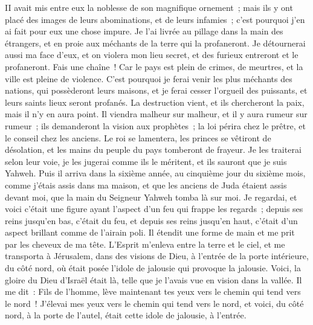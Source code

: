 \begin{multicols}{2}
II avait mis entre eux la noblesse de son magnifique ornement~; mais ils y ont placé des images de leurs abominations, et de leurs infamies~; c'est pourquoi j'en ai fait pour eux une chose impure.
Je l'ai livrée au pillage dans la main des étrangers, et en proie aux méchants de la terre qui la profaneront.
Je détournerai aussi ma face d'eux, et on violera mon lieu secret, et des furieux entreront et le profaneront.
Fais une chaîne~! Car le pays est plein de crimes, de meurtres, et la ville est pleine de violence.
C'est pourquoi je ferai venir les plus méchants des nations, qui possèderont leurs maisons, et je ferai cesser l'orgueil des puissants, et leurs saints lieux seront profanés.
La destruction vient, et ils chercheront la paix, mais il n'y en aura point.
Il viendra malheur sur malheur, et il y aura rumeur sur rumeur~; ils demanderont la vision aux prophètes~; la loi périra chez le prêtre, et le conseil chez les anciens.
Le roi se lamentera, les princes se vêtiront de désolation, et les mains du peuple du pays tomberont de frayeur. Je les traiterai selon leur voie, je les jugerai comme ils le méritent, et ils sauront que je suis Yahweh.
\VerseOne{}Puis il arriva dans la sixième année, au cinquième jour du sixième mois, comme j'étais assis dans ma maison, et que les anciens de Juda étaient assis devant moi, que la main du Seigneur Yahweh tomba là sur moi.
Je regardai, et voici c'était une figure ayant l'aspect d'un feu qui frappe les regards~; depuis ses reins jusqu'en bas, c'était du feu, et depuis ses reins jusqu'en haut, c'était d'un aspect brillant comme de l'airain poli.
Il étendit une forme de main et me prit par les cheveux de ma tête. L'Esprit m'enleva entre la terre et le ciel, et me transporta à Jérusalem, dans des visions de Dieu, à l'entrée de la porte intérieure, du côté nord, où était posée l'idole de jalousie qui provoque la jalousie.
Voici, la gloire du Dieu d'Israël était là, telle que je l'avais vue en vision dans la vallée.
Il me dit~: Fils de l'homme, lève maintenant tes yeux vers le chemin qui tend vers le nord~! J'élevai mes yeux vers le chemin qui tend vers le nord, et voici, du côté nord, à la porte de l'autel, était cette idole de jalousie, à l'entrée.

\end{multicols}
